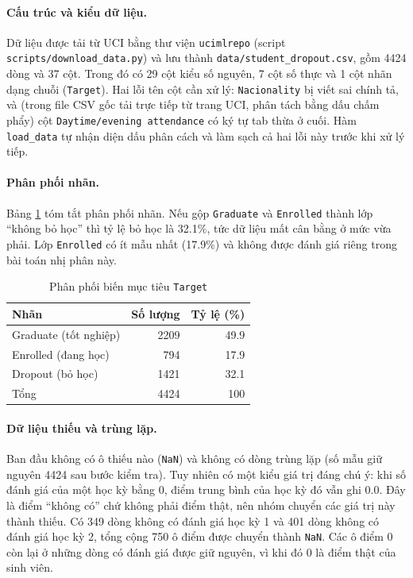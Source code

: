 \documentclass[12pt,a4paper]{article}
\begin{document}
\paragraph{Cấu trúc và kiểu dữ liệu.} Dữ liệu được tải từ UCI bằng thư viện \texttt{ucimlrepo} (script \texttt{scripts/download\_data.py}) và lưu thành \texttt{data/student\_dropout.csv}, gồm 4424 dòng và 37 cột. Trong đó có 29 cột kiểu số nguyên, 7 cột số thực và 1 cột nhãn dạng chuỗi (\texttt{Target}). Hai lỗi tên cột cần xử lý: \texttt{Nacionality} bị viết sai chính tả, và (trong file CSV gốc tải trực tiếp từ trang UCI, phân tách bằng dấu chấm phẩy) cột \texttt{Daytime/evening attendance} có ký tự tab thừa ở cuối. Hàm \texttt{load\_data} tự nhận diện dấu phân cách và làm sạch cả hai lỗi này trước khi xử lý tiếp.

\paragraph{Phân phối nhãn.} Bảng \ref{tab:label} tóm tắt phân phối nhãn. Nếu gộp \texttt{Graduate} và \texttt{Enrolled} thành lớp ``không bỏ học'' thì tỷ lệ bỏ học là 32.1\%, tức dữ liệu mất cân bằng ở mức vừa phải. Lớp \texttt{Enrolled} có ít mẫu nhất (17.9\%) và không được đánh giá riêng trong bài toán nhị phân này.

\begin{table}[H]
\centering
\caption{Phân phối biến mục tiêu \texttt{Target}}
\label{tab:label}
\begin{tabular}{lrr}
\toprule
Nhãn & Số lượng & Tỷ lệ (\%) \\
\midrule
Graduate (tốt nghiệp) & 2209 & 49.9 \\
Enrolled (đang học) & 794 & 17.9 \\
Dropout (bỏ học) & 1421 & 32.1 \\
\midrule
Tổng & 4424 & 100 \\
\bottomrule
\end{tabular}
\end{table}

\paragraph{Dữ liệu thiếu và trùng lặp.} Ban đầu không có ô thiếu nào (\texttt{NaN}) và không có dòng trùng lặp (số mẫu giữ nguyên 4424 sau bước kiểm tra). Tuy nhiên có một kiểu giá trị đáng chú ý: khi số đánh giá của một học kỳ bằng 0, điểm trung bình của học kỳ đó vẫn ghi 0.0. Đây là điểm ``không có'' chứ không phải điểm thật, nên nhóm chuyển các giá trị này thành thiếu. Có 349 dòng không có đánh giá học kỳ 1 và 401 dòng không có đánh giá học kỳ 2, tổng cộng 750 ô điểm được chuyển thành \texttt{NaN}. Các ô điểm 0 còn lại ở những dòng có đánh giá được giữ nguyên, vì khi đó 0 là điểm thật của sinh viên.
\end{document}
